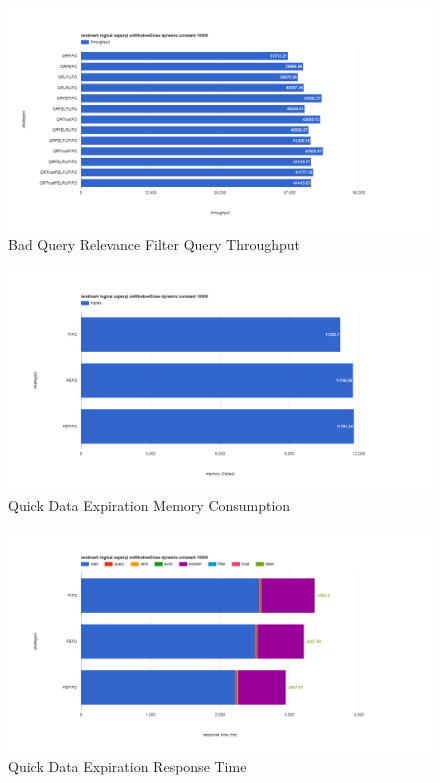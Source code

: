 \begin{figure}[!htbp]
    \centering
    \includegraphics[width=\textwidth]{img/app3-bqr-t.png}
    \caption{Bad Query Relevance Filter Query Throughput}
\end{figure}
\begin{figure}[!htbp]
    \centering
    \includegraphics[width=\textwidth]{img/app3-ets-quick-m.png}
    \caption{Quick Data Expiration Memory Consumption}
\end{figure}
\begin{figure}[!htpb]
    \centering
    \includegraphics[width=\textwidth]{img/app3-ets-quick-r.png}
    \caption{Quick Data Expiration Response Time}
\end{figure}
